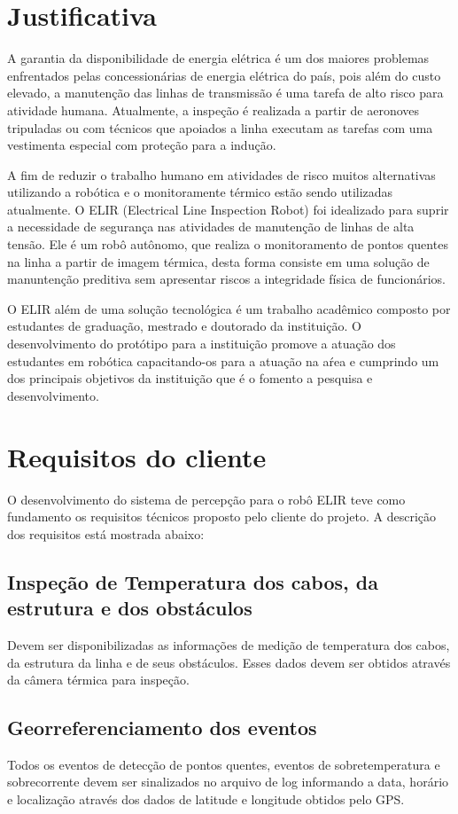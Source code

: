 \section{Justificativa}
\label{sec:justi}

A garantia da disponibilidade de energia elétrica é um dos maiores problemas enfrentados pelas concessionárias de energia elétrica do país, pois além do custo elevado, a manutenção das linhas de transmissão é uma tarefa de alto risco para atividade humana. Atualmente, a inspeção é realizada a partir de aeronoves tripuladas ou com técnicos que apoiados a linha executam as tarefas com uma vestimenta especial com proteção para a indução.

A fim de reduzir o trabalho humano em atividades de risco muitos alternativas utilizando a robótica e o monitoramente térmico estão sendo utilizadas atualmente. O ELIR (Electrical Line Inspection Robot) foi idealizado para suprir a necessidade de segurança nas atividades de manutenção de linhas de alta tensão. Ele é um robô autônomo, que realiza o monitoramento de pontos quentes na linha a partir de imagem térmica, desta forma consiste em uma solução de manuntenção preditiva sem apresentar riscos a integridade física de funcionários.

O ELIR além de uma solução tecnológica é um trabalho acadêmico composto por estudantes de graduação, mestrado e doutorado da instituição. O desenvolvimento do protótipo para a instituição promove a atuação dos estudantes em robótica capacitando-os para a atuação na aŕea e cumprindo um dos principais objetivos da instituição que é o fomento a pesquisa e desenvolvimento. 

\section{Requisitos do cliente}
\label{sec:reqc}
O desenvolvimento do sistema de percepção para o robô ELIR teve como fundamento os requisitos técnicos proposto pelo cliente do projeto. A descrição dos requisitos está mostrada abaixo:
    \subsection{Inspeção de Temperatura dos cabos, da estrutura e dos obstáculos} 
    Devem ser disponibilizadas as informações de medição de temperatura dos cabos, da estrutura da linha e de seus obstáculos. Esses dados devem ser obtidos através da câmera térmica para inspeção.    \subsection{Georreferenciamento dos eventos}
    Todos os eventos de detecção de pontos quentes, eventos de sobretemperatura e sobrecorrente devem ser sinalizados no arquivo de log informando a data, horário e localização através dos dados de latitude e longitude obtidos pelo GPS.
